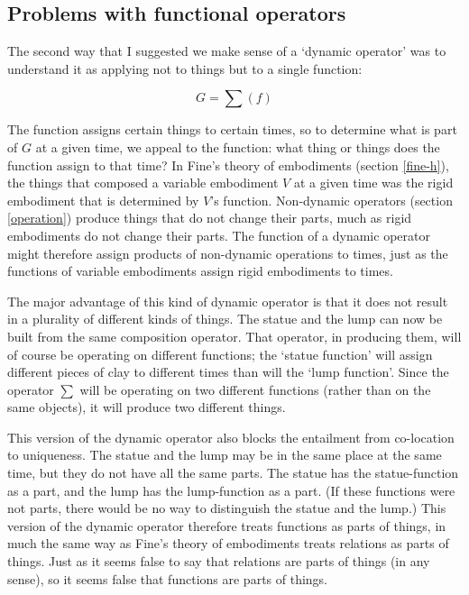 \documentclass[11pt]{article}
\begin{document}
\begin{spacing}{1.5}
\subsection{Problems with functional operators}
\label{problems2b}
The second way that I suggested we make sense of a `dynamic operator'
was to understand it as applying not to things but to a single
function:

\begin{displaymath}
G = \sum ( f )
\end{displaymath}

The function assigns certain things to certain times, so to determine
what is part of $G$ at a given time, we appeal to the function: what
thing or things does the function assign to that time?  In Fine's
theory of embodiments (section \ref{fine-h}), the things that composed
a variable embodiment $V$ at a given time was the rigid embodiment
that is determined by $V$'s function.  Non-dynamic operators (section
\ref{operation}) produce things that do not change their parts, much
as rigid embodiments do not change their parts.  The function of a
dynamic operator might therefore assign products of non-dynamic
operations to times, just as the functions of variable embodiments
assign rigid embodiments to times.

The major advantage of this kind of dynamic operator is that it does
not result in a plurality of different kinds of things.  The statue
and the lump can now be built from the same composition operator.
That operator, in producing them, will of course be operating on
different functions; the `statue function' will assign different
pieces of clay to different times than will the `lump function'.
Since the operator $\sum$ will be operating on two different functions
(rather than on the same objects), it will produce two different
things.

This version of the dynamic operator also blocks the entailment from
co-location to uniqueness.  The statue and the lump may be in the same
place at the same time, but they do not have all the same parts.  The
statue has the statue-function as a part, and the lump has the
lump-function as a part.  (If these functions were not parts, there
would be no way to distinguish the statue and the lump.)  This version
of the dynamic operator therefore treats functions as parts of things,
in much the same way as Fine's theory of embodiments treats relations
as parts of things.  Just as it seems false to say that relations are
parts of things (in any sense), so it seems false that functions are
parts of things.


\end{spacing}
\end{document}
